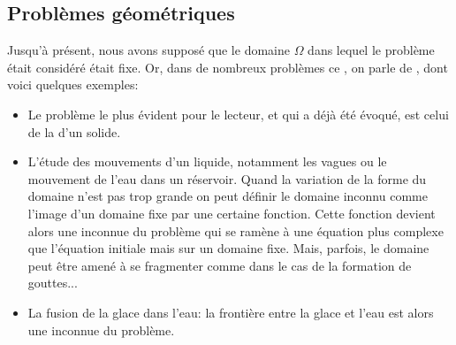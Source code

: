 \subsection{Problèmes géométriques}
Jusqu'à présent, nous avons supposé que le domaine $\Omega$ dans lequel le problème était considéré était fixe. Or, dans de nombreux problèmes ce , on parle de , dont voici quelques exemples:
\begin{itemize}
\item Le problème le plus évident pour le lecteur, et qui a déjà été évoqué, est celui de la  d'un solide.
\item L'étude des mouvements d'un liquide, notamment les vagues ou le mouvement de l'eau 	dans un réservoir.
	Quand la variation de la forme du domaine n'est pas trop grande on peut définir 	le domaine inconnu comme l'image d'un domaine fixe par une certaine fonction. Cette fonction devient alors une inconnue du problème qui se ramène à une équation plus complexe que l'équation initiale mais sur un domaine fixe. Mais, parfois, le domaine peut être amené à se fragmenter comme dans le cas de la formation de gouttes...
  \item La fusion de la glace dans l'eau: la frontière entre la glace et l'eau est alors une inconnue du problème.
\end{itemize}

\medskip
